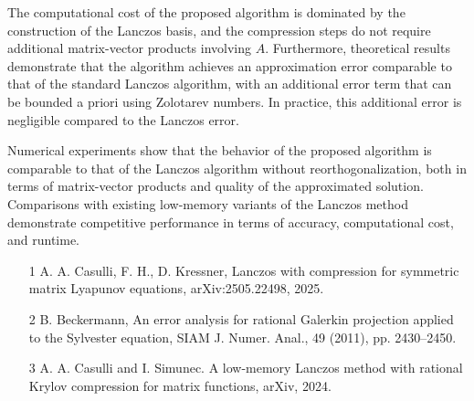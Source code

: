 \documentclass[ILAS2025-program.tex]{subfiles}
\begin{document}
\begin{ilasabstract}
The computational cost of the proposed algorithm is dominated by the construction of the Lanczos basis, and the compression steps do not require additional matrix-vector products involving $A$. Furthermore, theoretical results demonstrate that the algorithm achieves an approximation error comparable to that of the standard Lanczos algorithm, with an additional error term that can be bounded a priori using Zolotarev numbers. In practice, this additional error is negligible compared to the Lanczos error.

Numerical experiments show that the behavior of the proposed algorithm is comparable to that of the Lanczos algorithm without reorthogonalization, both in terms of matrix-vector products and quality of the approximated solution. Comparisons with existing low-memory variants of the Lanczos method demonstrate competitive performance in terms of accuracy, computational cost, and runtime.


\begin{itemize}
\item[1] A. A. Casulli, F. H., D. Kressner, Lanczos with compression for symmetric matrix Lyapunov equations, arXiv:2505.22498, 2025.
\item[2] B. Beckermann, An error analysis for rational Galerkin projection applied to the Sylvester
equation, SIAM J. Numer. Anal., 49 (2011), pp. 2430--2450. 
\item[3] A. A. Casulli and I. Simunec. A low-memory Lanczos method with rational
Krylov compression for matrix functions, arXiv, 2024.
\end{itemize} 

\end{ilasabstract}
    
\end{document}
